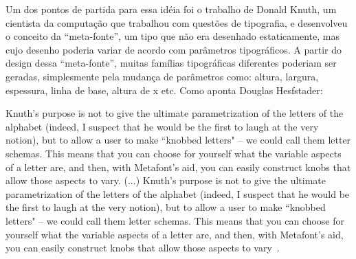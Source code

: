 Um dos pontos de partida para essa idéia foi o trabalho de Donald Knuth, um cientista da computação que trabalhou com questões de tipografia, e desenvolveu o conceito da ``meta-fonte'', um tipo que não era desenhado estaticamente, mas cujo desenho poderia variar de acordo com parâmetros tipográficos\cite{knuth-meta-font_1982}. A partir do design dessa ``meta-fonte'', muitas famílias tipográficas diferentes poderiam ser geradas, simplesmente pela mudança de parâmetros como: altura, largura, espessura, linha de base, altura de x etc. Como aponta Douglas Hesfstader:

\begin{citacao}
Knuth's purpose is not to give the ultimate parametrization of the letters of the alphabet (indeed, I suspect that he would be the first to laugh at the very notion), but to allow a user to make ``knobbed letters" -- we could call them letter schemas. This means that you can choose for yourself what the variable aspects of a letter are, and then, with Metafont's aid, you can easily construct knobs that allow those aspects to vary. 
(...)
Knuth's purpose is not to give the ultimate parametrization of the letters of the alphabet (indeed, I suspect that he would be the first to laugh at the very notion), but to allow a user to make ``knobbed letters" -- we could call them letter schemas. This means that you can choose for yourself what the variable aspects of a letter are, and then, with Metafont's aid, you can easily construct knobs that allow those aspects to vary~\cite{Metamagical1986}. 
\end{citacao}






